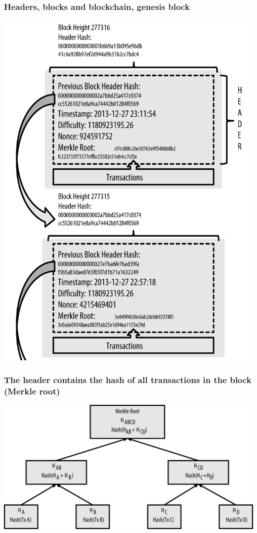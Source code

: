 \documentclass[11pt]{beamer}  %
\begin{document}
\begin{frame}\frametitle{Headers, blocks and blockchain, genesis block}

  \begin{center}
    \includegraphics[scale=0.2,clip=false]{pictures/bitcoin-blocks.png}
  \end{center}

\end{frame}

\begin{frame}\frametitle{The header contains the hash of all transactions in the block (Merkle root)}

  \begin{center}
    \includegraphics[width=\textwidth,clip=false]{pictures/mbc2_0902.png}
  \end{center}

\end{frame}
\end{document}
